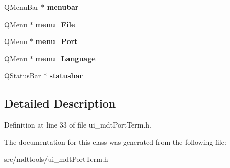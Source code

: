 \begin{DoxyCompactItemize}
\item 
\hypertarget{class_ui__mdt_port_term_a5419a1aeb22afed330b0b969a9aedd73}{
QMenuBar $\ast$ {\bfseries menubar}}
\label{class_ui__mdt_port_term_a5419a1aeb22afed330b0b969a9aedd73}

\item 
\hypertarget{class_ui__mdt_port_term_af4ff950d4030c0c2f203546caaa3a45f}{
QMenu $\ast$ {\bfseries menu\_\-File}}
\label{class_ui__mdt_port_term_af4ff950d4030c0c2f203546caaa3a45f}

\item 
\hypertarget{class_ui__mdt_port_term_a432f9e70278ef43133af282fba27092f}{
QMenu $\ast$ {\bfseries menu\_\-Port}}
\label{class_ui__mdt_port_term_a432f9e70278ef43133af282fba27092f}

\item 
\hypertarget{class_ui__mdt_port_term_a76b28956d67d1b795842eac918dadb49}{
QMenu $\ast$ {\bfseries menu\_\-Language}}
\label{class_ui__mdt_port_term_a76b28956d67d1b795842eac918dadb49}

\item 
\hypertarget{class_ui__mdt_port_term_ae922f4e6f3b8aa1db954038b8e335254}{
QStatusBar $\ast$ {\bfseries statusbar}}
\label{class_ui__mdt_port_term_ae922f4e6f3b8aa1db954038b8e335254}

\end{DoxyCompactItemize}


\subsection{Detailed Description}


Definition at line 33 of file ui\_\-mdtPortTerm.h.



The documentation for this class was generated from the following file:\begin{DoxyCompactItemize}
\item 
src/mdttools/ui\_\-mdtPortTerm.h\end{DoxyCompactItemize}
